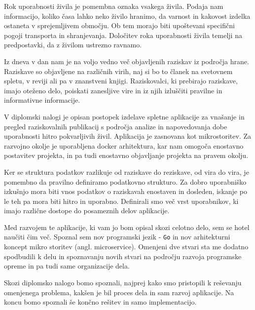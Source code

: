 \documentclass[a4paper, 12pt]{book}
\begin{document}
Rok uporabnosti živila je pomembna oznaka vsakega živila. Podaja nam informacijo, koliko časa lahko neko živilo hranimo, da varnost in kakovost izdelka ostaneta v sprejemljivem območju. Ob tem morajo biti upoštevani specifični pogoji transporta in shranjevanja. Določitev roka uporabnosti živila temelji na predpostavki, da z živilom ustrezno ravnamo.

Iz dneva v dan nam je na voljo vedno več objavljenih raziskav iz področja hrane. Raziskave so objavljene na različnih virih, naj si bo to članek na svetovnem spletu, v reviji ali pa v znanstveni knjigi. Raziskovalci, ki prebirajo raziskave, imajo oteženo delo, poiskati zanesljive vire in iz njih izluščiti pravilne in informativne informacije.

V diplomski nalogi je opisan postopek izdelave spletne aplikacije za vnašanje in pregled raziskovalnih publikacij s področja analize in napovedovanja dobe uporabnosti hitro pokvarljivih živil. Aplikacija je zasnovana kot mikrostoritev. Za razvojno okolje je uporabljena docker arhitektura, kar nam omogoča enostavno postavitev projekta, in pa tudi enostavno objavljanje projekta na pravem okolju. 

Ker se struktura podatkov razlikuje od raziskave do reziskave, od vira do vira, je pomembno da pravilno definiramo podatkovno strukturo. Za dobro uporabniško izkušnjo mora biti vnos podatkov o raziskavah enostaven in dosleden, iskanje po le teh pa mora biti hitro in uporabno. Definirali smo več vrst uporabnikov, ki imajo različne dostope do posameznih delov aplikacije.

Med razvojem te aplikacije, ki vam jo bom opisal skozi celotno delo, sem se hotel naučiti čim več. Spoznal sem nov programski jezik - \verb=Go= in nov arhitekturni koncept mikro storitev (angl. microservice). Omenjeni dve stvari sta me dodatno spodbudili k delu in spoznavanju novih stvari na področju razvoja programske opreme in pa tudi same organizacije dela.

Skozi diplomsko nalogo bomo spoznali, najprej kako smo pristopili k reševanju omenjenega problema, kakšen je bil proces dela in sam razvoj aplikacije. Na koncu bomo spoznali še končno rešitev in samo implementacijo.




\end{document}
